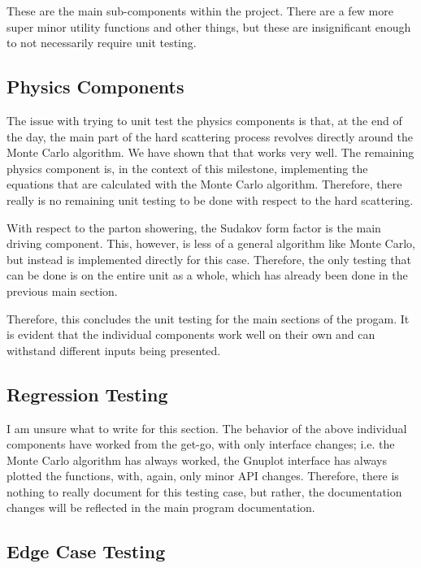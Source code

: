These are the main sub-components within the project. There are a few more super minor utility functions and other things, but these are insignificant enough to not necessarily require unit testing.

\subsection{Physics Components}

The issue with trying to unit test the physics components is that, at the end of the day, the main part of the hard scattering process revolves directly around the Monte Carlo algorithm. We have shown that that works very well. The remaining physics component is, in the context of this milestone, implementing the equations that are calculated with the Monte Carlo algorithm. Therefore, there really is no remaining unit testing to be done with respect to the hard scattering.

With respect to the parton showering, the Sudakov form factor is the main driving component. This, however, is less of a general algorithm like Monte Carlo, but instead is implemented directly for this case. Therefore, the only testing that can be done is on the entire unit as a whole, which has already been done in the previous main section.

Therefore, this concludes the unit testing for the main sections of the progam. It is evident that the individual components work well on their own and can withstand different inputs being presented.




\subsection{Regression Testing}

I am unsure what to write for this section. The behavior of the above individual components have worked from the get-go, with only interface changes; i.e. the Monte Carlo algorithm has always worked, the Gnuplot interface has always plotted the functions, with, again, only minor API changes. Therefore, there is nothing to really document for this testing case, but rather, the documentation changes will be reflected in the main program documentation.



\subsection{Edge Case Testing}

